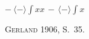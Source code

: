 \begin{ledgroupsized}[r]{114mm}
\newline%
\newline%
\hspace*{30mm}%
$\displaystyle -\ \langle-\rangle \!\!\int\!\! xx\, -\, \langle-\rangle\!\!\int\!\! x$
\pend
\end{ledgroupsized}
%
\begin{ledgroupsized}[r]{114mm}
\footnotesize%
\vspace{2mm}
\pstart%
\parindent -6mm
%
\textsc{Gerland} 1906, S.~35.\cite{00197}
\pend%
\end{ledgroupsized}
%
\vspace{5mm}

